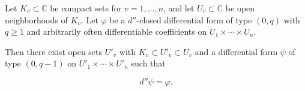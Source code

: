 Let $K_v \subset \mathbb{C}$ be compact sets for $v = 1, \ldots, n$, and let $U_v \subset \mathbb{C}$ be open neighborhoods of $K_v$. Let $\varphi$ be a $d''$-closed differential form of type $(0, q)$ with $q \geq 1$ and arbitrarily often differentiable coefficients on $U_1 \times \cdots \times U_n$.

Then there exist open sets $U'_v$ with $K_v \subset U'_v \subset U_v$ and a differential form $\psi$ of type $(0, q-1)$ on $U'_1 \times \cdots \times U'_n$ such that

$$d''\psi = \varphi.$$
